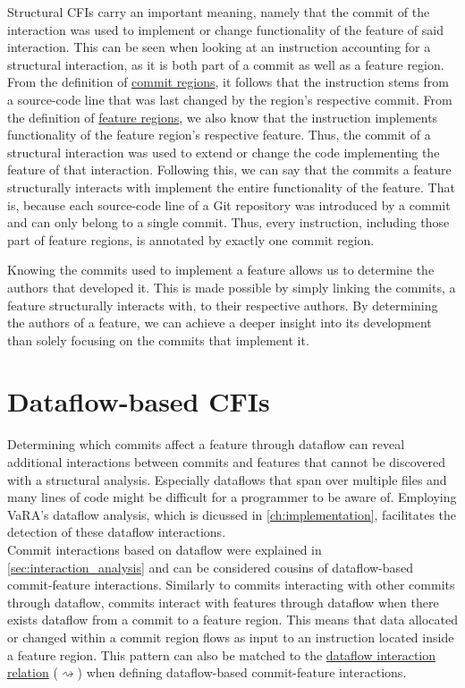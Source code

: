 Structural CFIs carry an important meaning, namely that the commit of the interaction was used to implement or change functionality of the feature of said interaction.
This can be seen when looking at an instruction accounting for a structural interaction, as it is both part of a commit as well as a feature region.
From the definition of \hyperref[def:commit_regions]{commit regions}, it follows that the instruction stems from a source-code line that was last changed by the region's respective commit. 
From the definition of \hyperref[def:feature_regions]{feature regions}, we also know that the instruction implements functionality of the feature region's respective feature. 
Thus, the commit of a structural interaction was used to extend or change the code implementing the feature of that interaction.
Following this, we can say that the commits a feature structurally interacts with implement the entire functionality of the feature.
That is, because each source-code line of a Git repository was introduced by a commit and can only belong to a single commit.
Thus, every instruction, including those part of feature regions, is annotated by exactly one commit region. 

Knowing the commits used to implement a feature allows us to determine the authors that developed it.
This is made possible by simply linking the commits, a feature structurally interacts with, to their respective authors.
By determining the authors of a feature, we can achieve a deeper insight into its development than solely focusing on the commits that implement it. 

\section{Dataflow-based CFIs}\label{sec:dataflow_cfis}

Determining which commits affect a feature through dataflow can reveal additional interactions between commits and features that cannot be discovered with a structural analysis.
Especially dataflows that span over multiple files and many lines of code might be difficult for a programmer to be aware of.
Employing VaRA's dataflow analysis, which is dicussed in \autoref{ch:implementation}, facilitates the detection of these dataflow interactions. \\
Commit interactions based on dataflow were explained in \autoref{sec:interaction_analysis} and can be considered cousins of dataflow-based commit-feature interactions.
Similarly to commits interacting with other commits through dataflow, commits interact with features through dataflow when there exists dataflow from a commit to a feature region.
This means that data allocated or changed within a commit region flows as input to an instruction located inside a feature region.
This pattern can also be matched to the \hyperref[def:dataflow_relation]{dataflow interaction relation} ($\rightsquigarrow$) when defining dataflow-based commit-feature interactions.

